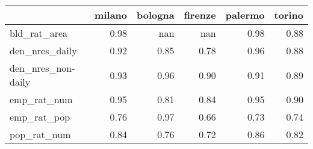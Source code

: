 \begin{tabular}{lrrrrr}
\toprule
{} &  milano &  bologna &  firenze &  palermo &  torino \\
\midrule
bld\_rat\_area       &    0.98 &      nan &      nan &     0.98 &    0.88 \\
den\_nres\_daily     &    0.92 &     0.85 &     0.78 &     0.96 &    0.88 \\
den\_nres\_non-daily &    0.93 &     0.96 &     0.90 &     0.91 &    0.89 \\
emp\_rat\_num        &    0.95 &     0.81 &     0.84 &     0.95 &    0.90 \\
emp\_rat\_pop        &    0.76 &     0.97 &     0.66 &     0.73 &    0.74 \\
pop\_rat\_num        &    0.84 &     0.76 &     0.72 &     0.86 &    0.82 \\
\bottomrule
\end{tabular}
